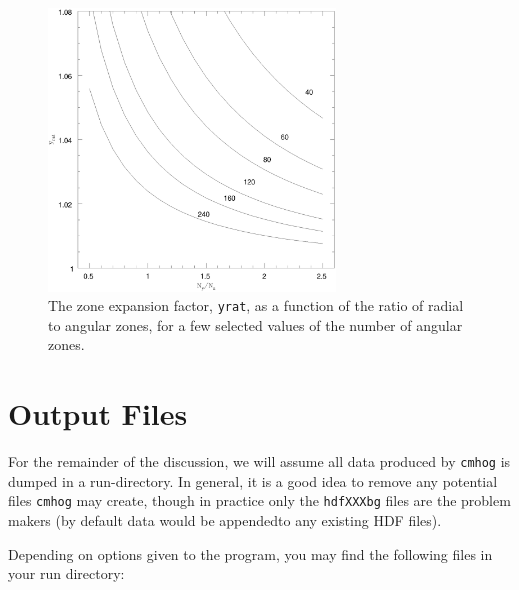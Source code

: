 \documentclass[10pt,dvips]{article}
\begin{document}
\begin{figure}[htbp]
\centering
\includegraphics[width=3in]{yrat.ps}
\caption{The zone expansion factor, {\tt yrat}, as a function of
the ratio of radial to angular zones, for a few selected values
of the number of angular zones.
}
\end{figure}


\section{Output Files}

For the remainder of the discussion, we will assume all data produced
by {\tt cmhog} is dumped in a run-directory. In general, it is a good
idea to remove any potential files {\tt cmhog} may create, though
in practice only the {\tt hdfXXXbg} files are the problem makers
(by default data would be appendedto any existing HDF files).

Depending on options given to the program, you may find the following files
in your run directory:
\end{document}
